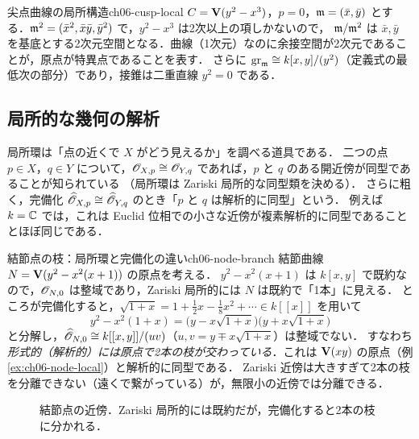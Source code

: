 \begin{myex}{尖点曲線の局所構造}{ch06-cusp-local}
$C=\mathbf{V}(y^2-x^3)$，$p=0$，$\mathfrak{m}=(\bar x,\bar y)$ とする．$\mathfrak{m}^2=(\bar x^2,\bar x\bar y,\bar y^2)$ で，$y^2-x^3$ は2次以上の項しかないので，
$\mathfrak{m}/\mathfrak{m}^2$ は $\bar x,\bar y$ を基底とする2次元空間となる．曲線（1次元）なのに余接空間が2次元であることが，原点が特異点であることを表す．
さらに $\mathrm{gr}_{\mathfrak{m}}\cong k[x,y]/(y^2)$（定義式の最低次の部分）であり，接錐は二重直線 $y^2=0$ である．
\end{myex}

\subsection{局所的な幾何の解析}

局所環は「点の近くで $X$ がどう見えるか」を調べる道具である．
二つの点 $p\in X$，$q\in Y$ について，$\mathscr{O}_{X,p}\cong\mathscr{O}_{Y,q}$ であれば，$p$ と $q$ のある開近傍が同型であることが知られている
（局所環は Zariski 局所的な同型類を決める）．
さらに粗く，完備化 $\widehat{\mathscr{O}}_{X,p}\cong\widehat{\mathscr{O}}_{Y,q}$ のとき「$p$ と $q$ は解析的に同型」という．
例えば $k=\mathbb{C}$ では，これは Euclid 位相での小さな近傍が複素解析的に同型であることとほぼ同じである．

\begin{myex}{結節点の枝：局所環と完備化の違い}{ch06-node-branch}
結節曲線 $N=\mathbf{V}(y^2-x^2(x+1))$ の原点を考える．
$y^2-x^2(x+1)$ は $k[x,y]$ で既約なので，$\mathscr{O}_{N,0}$ は整域であり，Zariski 局所的には $N$ は既約で「1本」に見える．
ところが完備化すると，$\sqrt{1+x}=1+\tfrac12x-\tfrac18x^2+\cdots\in k[[x]]$ を用いて
\[
  y^2-x^2(1+x)=\bigl(y-x\sqrt{1+x}\bigr)\bigl(y+x\sqrt{1+x}\bigr)
\]
と分解し，$\widehat{\mathscr{O}}_{N,0}\cong k[[x,y]]/(uv)$（$u,v=y\mp x\sqrt{1+x}$）は整域でない．
すなわち\emph{形式的（解析的）には原点で2本の枝が交わっている}．これは $\mathbf{V}(xy)$ の原点（例 \ref{ex:ch06-node-local}）と解析的に同型である．
Zariski 近傍は大きすぎて2本の枝を分離できない（遠くで繋がっている）が，無限小の近傍では分離できる．
\end{myex}

\begin{figure}[H]
\centering
{}
\caption{結節点の近傍．Zariski 局所的には既約だが，完備化すると2本の枝に分かれる．}
\label{fig:ch06-node}
\end{figure}


